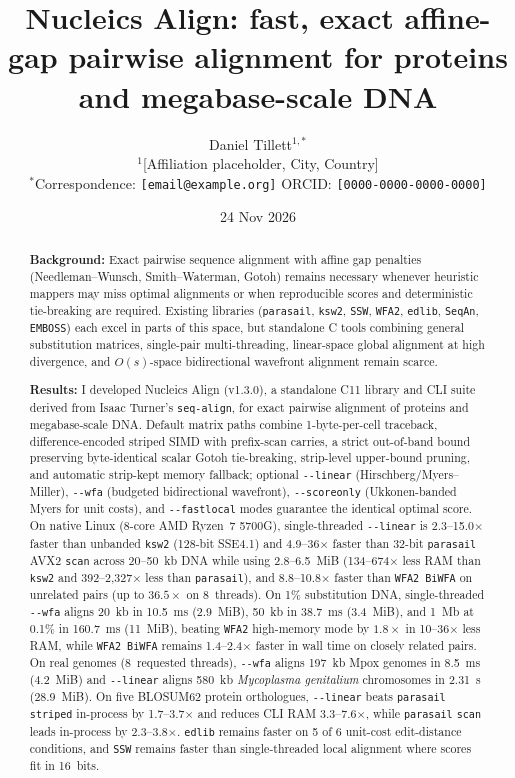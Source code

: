 \documentclass[11pt,a4paper]{article}
\title{\textbf{Nucleics Align: fast, exact affine-gap pairwise alignment for proteins and megabase-scale DNA}}
\author{Daniel Tillett$^{1,*}$ \\[6pt]
\small $^{1}$[Affiliation placeholder, City, Country] \\
\small $^{*}$Correspondence: \texttt{[email@example.org]} \quad ORCID: \texttt{[0000-0000-0000-0000]}}
\date{24 Nov 2026}
\begin{document}
\maketitle

\begin{abstract}
\noindent\textbf{Background:} Exact pairwise sequence alignment with affine gap penalties (Needleman--Wunsch, Smith--Waterman, Gotoh) remains necessary whenever heuristic mappers may miss optimal alignments or when reproducible scores and deterministic tie-breaking are required. Existing libraries (\texttt{parasail}, \texttt{ksw2}, \texttt{SSW}, \texttt{WFA2}, \texttt{edlib}, \texttt{SeqAn}, \texttt{EMBOSS}) each excel in parts of this space, but standalone C tools combining general substitution matrices, single-pair multi-threading, linear-space global alignment at high divergence, and $O(s)$-space bidirectional wavefront alignment remain scarce.

\medskip
\noindent\textbf{Results:} I developed Nucleics Align (v1.3.0), a standalone C11 library and CLI suite derived from Isaac Turner's \texttt{seq-align}, for exact pairwise alignment of proteins and megabase-scale DNA. Default matrix paths combine 1-byte-per-cell traceback, difference-encoded striped SIMD with prefix-scan carries, a strict out-of-band bound preserving byte-identical scalar Gotoh tie-breaking, strip-level upper-bound pruning, and automatic strip-kept memory fallback; optional \texttt{-{}-linear} (Hirschberg/Myers--Miller), \texttt{-{}-wfa} (budgeted bidirectional wavefront), \texttt{-{}-scoreonly} (Ukkonen-banded Myers for unit costs), and \texttt{-{}-fastlocal} modes guarantee the identical optimal score. On native Linux (8-core AMD Ryzen~7 5700G), single-threaded \texttt{-{}-linear} is 2.3--15.0$\times$ faster than unbanded \texttt{ksw2} (128-bit SSE4.1) and 4.9--36$\times$ faster than 32-bit \texttt{parasail} AVX2 \texttt{scan} across 20--50~kb DNA while using 2.8--6.5~MiB (134--674$\times$ less RAM than \texttt{ksw2} and 392--2,327$\times$ less than \texttt{parasail}), and 8.8--10.8$\times$ faster than \texttt{WFA2 BiWFA} on unrelated pairs (up to $36.5\times$ on 8~threads). On 1\% substitution DNA, single-threaded \texttt{-{}-wfa} aligns 20~kb in 10.5~ms (2.9~MiB), 50~kb in 38.7~ms (3.4~MiB), and 1~Mb at 0.1\% in 160.7~ms (11~MiB), beating \texttt{WFA2} high-memory mode by $1.8\times$ in 10--36$\times$ less RAM, while \texttt{WFA2 BiWFA} remains 1.4--2.4$\times$ faster in wall time on closely related pairs. On real genomes (8~requested threads), \texttt{-{}-wfa} aligns 197~kb Mpox genomes in 8.5~ms (4.2~MiB) and \texttt{-{}-linear} aligns 580~kb \textit{Mycoplasma genitalium} chromosomes in 2.31~s (28.9~MiB). On five BLOSUM62 protein orthologues, \texttt{-{}-linear} beats \texttt{parasail} \texttt{striped} in-process by 1.7--3.7$\times$ and reduces CLI RAM 3.3--7.6$\times$, while \texttt{parasail} \texttt{scan} leads in-process by 2.3--3.8$\times$. \texttt{edlib} remains faster on 5 of 6 unit-cost edit-distance conditions, and \texttt{SSW} remains faster than single-threaded local alignment where scores fit in 16~bits.


\end{abstract}
\end{document}
